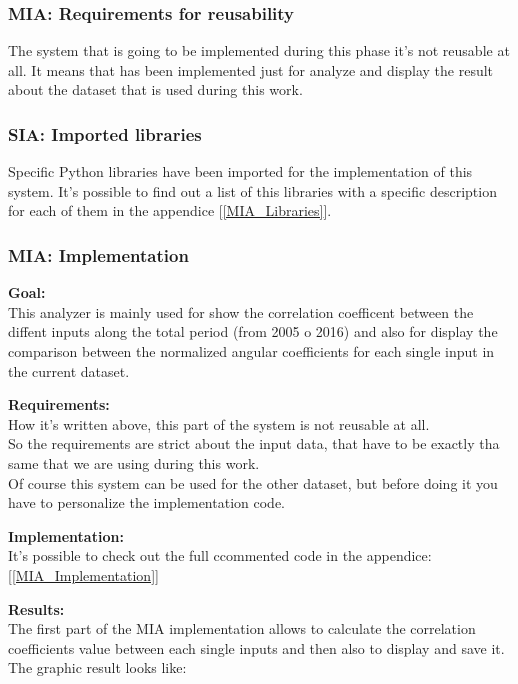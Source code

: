 \subsubsection{MIA: Requirements for reusability}
The system that is going to be implemented during this phase it's not reusable at all.
It means that has been implemented just for analyze and display the result about the dataset that is used during this work.

\subsubsection{SIA: Imported libraries}
Specific Python libraries have been imported for the implementation of this system.
It's possible to find out a list of this libraries with a specific description for each of them in the appendice [\ref{MIA_Libraries}].

\newpage

\subsubsection{MIA: Implementation}
\textbf{Goal:}\\
This analyzer is mainly used for show the correlation coefficent between the diffent inputs along the total period (from 2005 o 2016) and also for display the comparison between the normalized angular coefficients for each single input in the current dataset.

\textbf{Requirements:}\\
How it's written above, this part of the system is not reusable at all.\\
So the requirements are strict about the input data, that have to be exactly tha same that we are using during this work.\\
Of course this system can be used for the other dataset, but before doing it you have to personalize the implementation code.

\textbf{Implementation:}\\
It's possible to check out the full ccommented code in the appendice: [\ref{MIA_Implementation}]

\textbf{Results:} \\
The first part of the MIA implementation allows to calculate the correlation coefficients value between each single inputs and then also to display and save it. The graphic result looks like:

